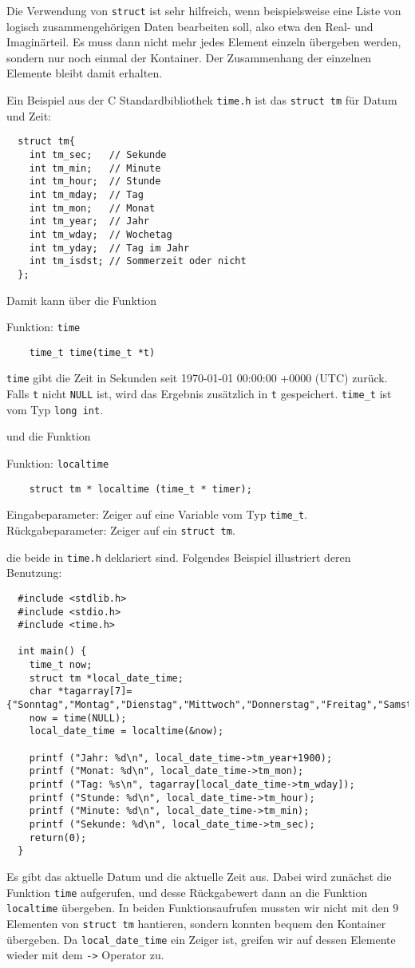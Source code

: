 Die Verwendung von \verb|struct| ist sehr hilfreich, wenn beispielsweise eine Liste von logisch zusammengehörigen Daten bearbeiten soll, also etwa den Real- und Imaginärteil.
Es muss dann nicht mehr jedes Element einzeln übergeben werden, sondern nur noch einmal der Kontainer.
Der Zusammenhang der einzelnen Elemente bleibt damit erhalten.

Ein Beispiel aus der C Standardbibliothek \verb|time.h| ist das \verb|struct tm| für Datum und Zeit:
\begin{lstlisting}
  struct tm{
    int tm_sec;   // Sekunde
    int tm_min;   // Minute
    int tm_hour;  // Stunde
    int tm_mday;  // Tag
    int tm_mon;   // Monat
    int tm_year;  // Jahr
    int tm_wday;  // Wochetag
    int tm_yday;  // Tag im Jahr
    int tm_isdst; // Sommerzeit oder nicht
  };
\end{lstlisting}
Damit kann über die Funktion
\begin{myexampleblock}{Funktion: \texttt{time}}
  \begin{lstlisting}
    time_t time(time_t *t)
  \end{lstlisting}
  \vspace{-0.4cm}
  \verb|time| gibt die Zeit in Sekunden seit 1970-01-01 00:00:00 +0000 (UTC) zurück.
  Falls \verb|t| nicht \verb|NULL| ist, wird das Ergebnis zusätzlich in \verb|t| gespeichert.
  \verb|time_t| ist vom Typ \verb|long int|.
\end{myexampleblock}
und die Funktion
\begin{myexampleblock}{Funktion: \texttt{localtime}}
  \begin{lstlisting}
    struct tm * localtime (time_t * timer);
  \end{lstlisting}
  \vspace{-0.4cm}
  Eingabeparameter: Zeiger auf eine Variable vom Typ \verb|time_t|.
  Rückgabeparameter: Zeiger auf ein \verb|struct tm|.
\end{myexampleblock}
die beide in \verb|time.h| deklariert sind.
Folgendes Beispiel illustriert deren Benutzung:
\begin{lstlisting}
  #include <stdlib.h>
  #include <stdio.h>
  #include <time.h>
  
  int main() {
    time_t now;
    struct tm *local_date_time;
    char *tagarray[7]={"Sonntag","Montag","Dienstag","Mittwoch","Donnerstag","Freitag","Samstag"};
    now = time(NULL);
    local_date_time = localtime(&now);

    printf ("Jahr: %d\n", local_date_time->tm_year+1900);
    printf ("Monat: %d\n", local_date_time->tm_mon);
    printf ("Tag: %s\n", tagarray[local_date_time->tm_wday]);
    printf ("Stunde: %d\n", local_date_time->tm_hour);
    printf ("Minute: %d\n", local_date_time->tm_min);
    printf ("Sekunde: %d\n", local_date_time->tm_sec);
    return(0);
  }
\end{lstlisting}
Es gibt das aktuelle Datum und die aktuelle Zeit aus.
Dabei wird zunächst die Funktion \verb|time| aufgerufen, und desse Rückgabewert dann an die Funktion \verb|localtime| übergeben.
In beiden Funktionsaufrufen mussten wir nicht mit den $9$ Elementen von \verb|struct tm| hantieren, sondern konnten bequem den Kontainer übergeben.
Da \verb|local_date_time| ein Zeiger ist, greifen wir auf dessen Elemente wieder mit dem \verb|->| Operator zu.
